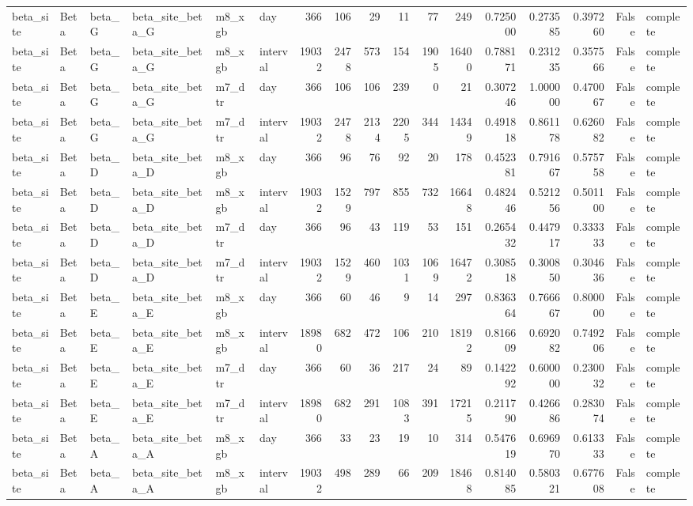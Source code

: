 \begin{tabular}{llllllrrrrrrrrrrl}
beta_site & Beta & beta_G & beta_site_beta_G & m8_xgb & day & 366 & 106 & 29 & 11 & 77 & 249 & 0.725000 & 0.273585 & 0.397260 & False & complete \\
beta_site & Beta & beta_G & beta_site_beta_G & m8_xgb & interval & 19032 & 2478 & 573 & 154 & 1905 & 16400 & 0.788171 & 0.231235 & 0.357566 & False & complete \\
beta_site & Beta & beta_G & beta_site_beta_G & m7_dtr & day & 366 & 106 & 106 & 239 & 0 & 21 & 0.307246 & 1.000000 & 0.470067 & False & complete \\
beta_site & Beta & beta_G & beta_site_beta_G & m7_dtr & interval & 19032 & 2478 & 2134 & 2205 & 344 & 14349 & 0.491818 & 0.861178 & 0.626082 & False & complete \\
beta_site & Beta & beta_D & beta_site_beta_D & m8_xgb & day & 366 & 96 & 76 & 92 & 20 & 178 & 0.452381 & 0.791667 & 0.575758 & False & complete \\
beta_site & Beta & beta_D & beta_site_beta_D & m8_xgb & interval & 19032 & 1529 & 797 & 855 & 732 & 16648 & 0.482446 & 0.521256 & 0.501100 & False & complete \\
beta_site & Beta & beta_D & beta_site_beta_D & m7_dtr & day & 366 & 96 & 43 & 119 & 53 & 151 & 0.265432 & 0.447917 & 0.333333 & False & complete \\
beta_site & Beta & beta_D & beta_site_beta_D & m7_dtr & interval & 19032 & 1529 & 460 & 1031 & 1069 & 16472 & 0.308518 & 0.300850 & 0.304636 & False & complete \\
beta_site & Beta & beta_E & beta_site_beta_E & m8_xgb & day & 366 & 60 & 46 & 9 & 14 & 297 & 0.836364 & 0.766667 & 0.800000 & False & complete \\
beta_site & Beta & beta_E & beta_site_beta_E & m8_xgb & interval & 18980 & 682 & 472 & 106 & 210 & 18192 & 0.816609 & 0.692082 & 0.749206 & False & complete \\
beta_site & Beta & beta_E & beta_site_beta_E & m7_dtr & day & 366 & 60 & 36 & 217 & 24 & 89 & 0.142292 & 0.600000 & 0.230032 & False & complete \\
beta_site & Beta & beta_E & beta_site_beta_E & m7_dtr & interval & 18980 & 682 & 291 & 1083 & 391 & 17215 & 0.211790 & 0.426686 & 0.283074 & False & complete \\
beta_site & Beta & beta_A & beta_site_beta_A & m8_xgb & day & 366 & 33 & 23 & 19 & 10 & 314 & 0.547619 & 0.696970 & 0.613333 & False & complete \\
beta_site & Beta & beta_A & beta_site_beta_A & m8_xgb & interval & 19032 & 498 & 289 & 66 & 209 & 18468 & 0.814085 & 0.580321 & 0.677608 & False & complete \\

\end{tabular}
